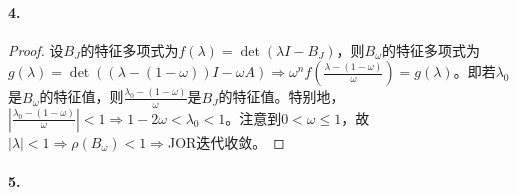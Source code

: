\documentclass{ctexart}
\begin{document}
\paragraph{4.}
\begin{proof}
设$B_J$的特征多项式为$f(\lambda)=\det(\lambda I-B_J)$，则$B_\omega$的特征多项式为$g(\lambda)=\det((\lambda-(1-\omega))I-\omega A)\Rightarrow \omega^nf(\frac{\lambda-(1-\omega)}{\omega})=g(\lambda)$。即若$\lambda_0$是$B_\omega$的特征值，则$\frac{\lambda_0-(1-\omega)}{\omega}$是$B_J$的特征值。特别地，$|\frac{\lambda_0-(1-\omega)}{\omega}|<1\Rightarrow 1-2\omega<\lambda_0<1 $。注意到$0<\omega\leq 1$，故$|\lambda|<1\Rightarrow \rho(B_\omega)<1\Rightarrow$JOR迭代收敛。
\end{proof}

\paragraph{5.}
\end{document}
